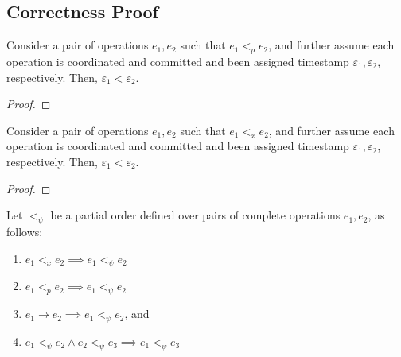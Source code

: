 \subsection{Correctness Proof}
\label{sec:correctness}


\begin{lemma}
\label{lemma1}
Consider a pair of operations $e_1, e_2$ such that $e_1 <_p e_2$, and further assume each operation is coordinated and committed and been assigned timestamp $\varepsilon_1, \varepsilon_2$, respectively. Then, $\varepsilon_1 < \varepsilon_2$.
\end{lemma}
\begin{proof}
\end{proof}

\begin{lemma}
\label{lemma2}
Consider a pair of operations $e_1, e_2$ such that $e_1 <_x e_2$, and further assume each operation is coordinated and committed and been assigned timestamp $\varepsilon_1, \varepsilon_2$, respectively. Then, $\varepsilon_1 < \varepsilon_2$.
\end{lemma}
\begin{proof}
\end{proof}


Let $<_\psi$ be a partial order defined over pairs of complete operations $e_1, e_2$, as follows:
\begin{enumerate}
    \item $e_1 <_x e_2 \implies e_1 <_\psi e_2$
    \item $e_1 <_p e_2 \implies e_1 <_\psi e_2$
    \item $e_1 \rightarrow e_2 \implies e_1 <_\psi e_2$, and
    \item $e_1 <_\psi e_2 \land e_2 <_\psi e_3 \implies e_1 <_\psi e_3$
\end{enumerate}

